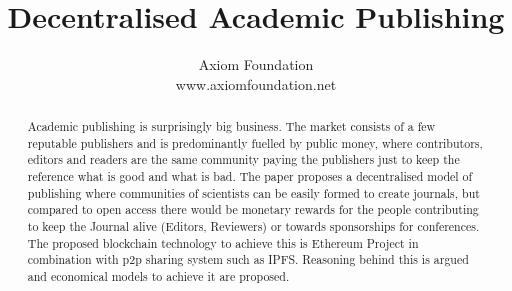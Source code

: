 \documentclass[12pt, a4paper]{article}
\title{Decentralised Academic Publishing}
\author
{Axiom Foundation
\\
\normalsize{www.axiomfoundation.net}
}
\date{}
\begin{document}
 


\maketitle 
\thispagestyle{title}

\begin{abstract}
Academic publishing is surprisingly big business. The market consists of a few reputable publishers and is predominantly fuelled by public money, where contributors, editors and readers are the same community paying the publishers just to keep the reference what is good and what is bad. The paper proposes a decentralised model of publishing where communities of scientists can be easily formed to create journals, but compared to open access there would be monetary rewards for the people contributing to keep the Journal alive (Editors, Reviewers) or towards sponsorships for conferences. The proposed blockchain technology to achieve this is Ethereum Project in combination with p2p sharing system such as IPFS. Reasoning behind this is argued and economical models to achieve it are proposed.
\end{abstract}


\end{document}
